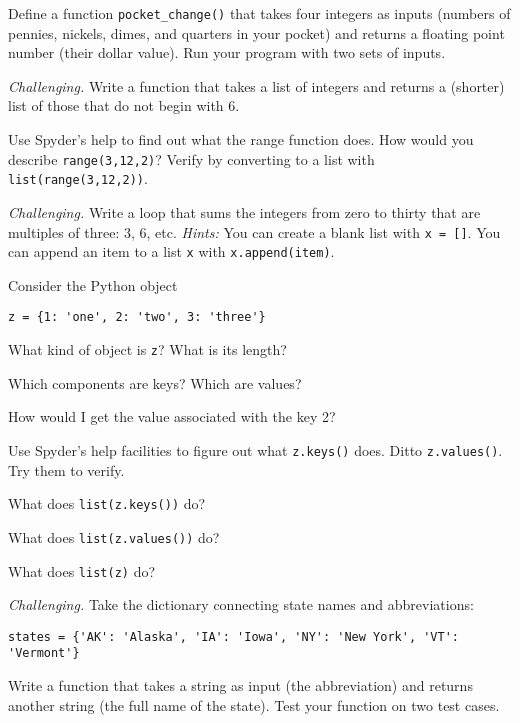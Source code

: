 \documentclass[11pt]{exam}
\begin{document}
\begin{questions}

\item Define a function \verb|pocket_change()| that takes four integers as inputs 
(numbers of pennies, nickels, dimes, and quarters in your pocket)
and returns a floating point number (their dollar value).  
Run your program with two sets of inputs.  

\item {\it Challenging.\/}
Write a function that takes a list of integers
and returns a (shorter) list of those that do not begin with 6.


\item Use Spyder's help to find out what the range function does.  
How would you describe {\tt range(3,12,2)}?  
Verify by converting to a list with {\tt list(range(3,12,2))}.

\item {\it Challenging.\/}
Write a loop that sums the integers from zero to thirty that are multiples of three:
3, 6, etc.
{\it Hints:}  You can create a blank list with {\tt x = []}.  
You can append an item to a list {\tt x} with {\tt x.append(item)}. 


\item Consider the Python object
\begin{verbatim}
z = {1: 'one', 2: 'two', 3: 'three'} 
\end{verbatim} 
\begin{parts}
\item What kind of object is {\tt z}?  What is its length?  
\item Which components are keys?  Which are values? 
\item How would I get the value associated with the key 2?
\item Use Spyder's help facilities to figure out what {\tt z.keys()} does.  
Ditto {\tt z.values()}.  Try them to verify.  
\item What does {\tt list(z.keys())} do?
\item What does {\tt list(z.values())} do?
\item What does {\tt list(z)} do?
\end{parts} 


\item {\it Challenging.\/} 
Take the dictionary connecting state names and abbreviations:
\begin{verbatim}
states = {'AK': 'Alaska', 'IA': 'Iowa', 'NY': 'New York', 'VT': 'Vermont'} 
\end{verbatim} 
Write a function that takes a string as input (the abbreviation) 
and returns another string (the full name of the state).
Test your function on two test cases.  


\end{questions}
\end{document}
